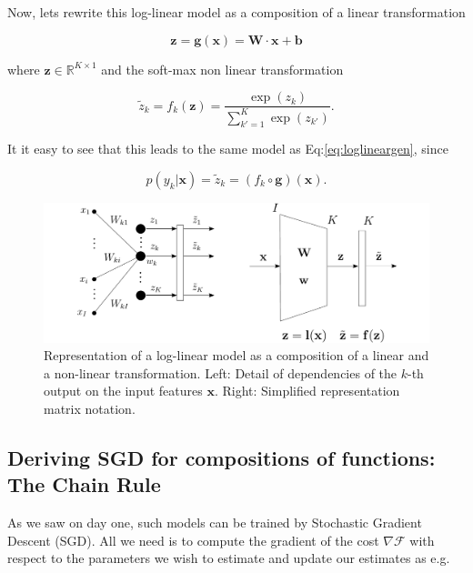 \noindent Now, lets rewrite this log-linear model as a composition of a linear
transformation 

\begin{equation}
\mathbf{z} = \mathbf{g}(\mathbf{x}) = \mathbf{W} \cdot \mathbf{x} + \mathbf{b}
\label{eq:linear}
\end{equation}

\noindent where $\mathbf{z} \in \mathbb{R}^{K \times 1}$ and the soft-max non
linear transformation

\begin{equation}
\tilde{z}_k = f_k(\mathbf{z}) = \frac{\exp(z_k)}{\sum_{k'=1}^K \exp(z_{k'})}.
\label{eq:softmax}
\end{equation}

\noindent It it easy to see that this leads to the same model as
Eq:\ref{eq:loglineargen}, since

\begin{equation}
p(y_k|\mathbf{x}) = \tilde{z}_k = (f_k \circ \mathbf{g})(\mathbf{x}). 
\end{equation}

\begin{figure}
\centering
\includegraphics[scale=0.4]{figs/deep_learning/LayerP.pdf}
\caption{Representation of a log-linear model as a composition of a linear and
a non-linear transformation. Left: Detail of dependencies of the $k$-th output
on the input features $\mathbf{x}$. Right: Simplified representation matrix
notation.}
\label{fig:LayerP}
\end{figure}

\subsection{Deriving SGD for compositions of functions: The Chain Rule}

As we saw on day one, such models can be trained by Stochastic Gradient Descent
(SGD). All we need is to compute the gradient of the cost $\nabla\mathcal{F}$
with respect to the parameters we wish to estimate and update our estimates as
e.g.

